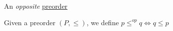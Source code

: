 An \emph{opposite} \href{doc/1 math/Seven Sketches in Compositionality/1 Chapter 1: Generative Effects/3 Preorders/1 Preorder}{preorder}

Given a preorder $(P, \leq)$, we define $p \leq^{op} q \iff q \leq p$

